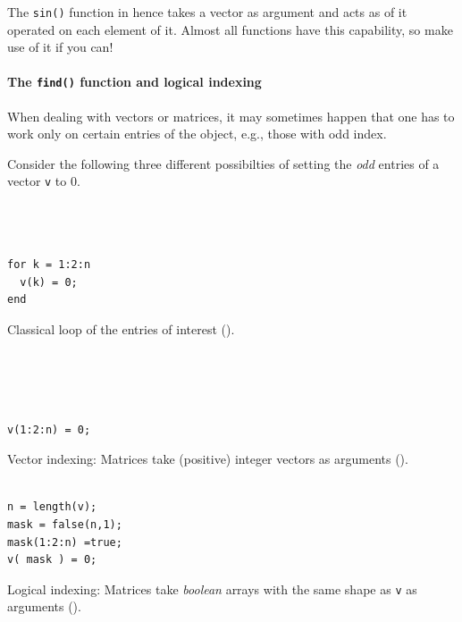 The \lstinline!sin()! function in \matlab{} hence takes a vector as argument and acts as of it operated on each element of it. Almost all \matlab{} functions have this capability, so make use of it if you can!


\paragraph{The \lstinline!find()! function and logical indexing}

When dealing with vectors or matrices, it may sometimes happen that one has to work only on certain entries of the object, e.g., those with odd index.

Consider the following three different possibilties of setting the \emph{odd} entries of a vector \lstinline!v! to $0$.

\hfill
\begin{minipage}[t]{.29\textwidth}
\begin{lstlisting}[framerule=1pt,rulecolor=\color{goodgreen}]
% [...] create v



for k = 1:2:n
  v(k) = 0;
end
\end{lstlisting}
Classical loop of the entries of interest ().
\end{minipage}
\hfill
\begin{minipage}[t]{.29\textwidth}
\begin{lstlisting}[framerule=1pt,rulecolor=\color{mediocre}]
% [...] create v




v(1:2:n) = 0;

\end{lstlisting}
Vector indexing: Matrices take (positive) integer vectors as arguments ().
\end{minipage}
\hfill
\begin{minipage}[t]{.29\textwidth}
\begin{lstlisting}[framerule=1pt,rulecolor=\color{badred}]
% [...] create v

n = length(v);
mask = false(n,1);
mask(1:2:n) =true;
v( mask ) = 0;

\end{lstlisting}
Logical indexing\footnotemark: Matrices take \emph{boolean} arrays with the same shape as \lstinline!v! as arguments ().
\end{minipage}
\hfill
{}

